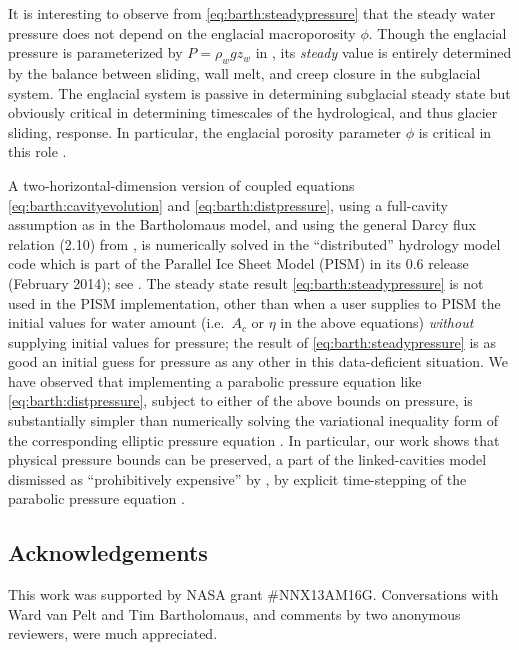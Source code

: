 \documentclass[twocolumn]{igs}
\begin{document}
It is interesting to observe from \eqref{eq:barth:steadypressure} that the steady water pressure does not depend on the englacial macroporosity $\phi$.  Though the englacial pressure is parameterized by $P=\rho_w g z_w$ in \cite{Bartholomausetal2011}, its \emph{steady} value is entirely determined by the balance between sliding, wall melt, and creep closure in the subglacial system.  The englacial system is passive in determining subglacial steady state but obviously critical in determining timescales of the hydrological, and thus glacier sliding, response.  In particular, the englacial porosity parameter $\phi$ is critical in this role \citep{vanPeltthesis}.

A two-horizontal-dimension version of coupled equations \eqref{eq:barth:cavityevolution} and \eqref{eq:barth:distpressure}, using a full-cavity assumption as in the Bartholomaus model, and using the general Darcy flux relation (2.10) from \cite{Schoofetal2012}, is numerically solved in the ``distributed'' hydrology model code which is part of the Parallel Ice Sheet Model (PISM) in its 0.6 release (February 2014); see \cite{BuelervanPeltDRAFT}.  The steady state result \eqref{eq:barth:steadypressure} is not used in the PISM implementation, other than when a user supplies to PISM the initial values for water amount (i.e.~$A_c$ or $\eta$ in the above equations) \emph{without} supplying initial values for pressure; the result of \eqref{eq:barth:steadypressure} is as good an initial guess for pressure as any other in this data-deficient situation.  We have observed that implementing a parabolic pressure equation like \eqref{eq:barth:distpressure}, subject to either of the above bounds on pressure, is substantially simpler than numerically solving the variational inequality form of the corresponding elliptic pressure equation \citep{Schoofetal2012}.  In particular, our work shows that physical pressure bounds can be preserved, a part of the linked-cavities model dismissed as ``prohibitively expensive'' by \cite{Werderetal2013}, by explicit time-stepping of the parabolic pressure equation \citep{BuelervanPeltDRAFT}.


\subsection*{Acknowledgements}  This work was supported by NASA grant \#NNX13AM16G.  Conversations with Ward van Pelt and Tim Bartholomaus, and comments by two anonymous reviewers, were much appreciated.



\end{document}
